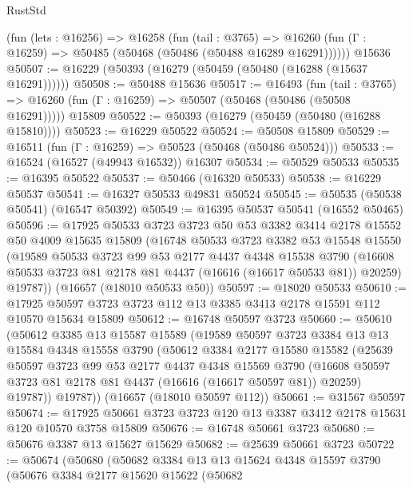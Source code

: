 \begin{lexlean}{RustStd}
\begin{coremodule}
    (fun (lets : @16256) =>
    @16258
      (fun (tail : @3765) =>
      @16260 (fun (Γ : @16259) => @50485 (@50468 (@50486 (@50488 @16289 @16291))))))
    @15636
@50507 := @16229 (@50393 (@16279 (@50459 (@50480 (@16288 (@15637 @16291))))))
@50508 := @50488 @15636
@50517 := @16493
    (fun (tail : @3765) => @16260 (fun (Γ : @16259) => @50507 (@50468 (@50486 (@50508 @16291)))))
    @15809
@50522 := @50393 (@16279 (@50459 (@50480 (@16288 @15810))))
@50523 := @16229 @50522
@50524 := @50508 @15809
@50529 := @16511 (fun (Γ : @16259) => @50523 (@50468 (@50486 @50524)))
@50533 := @16524 (@16527 (@49943 @16532)) @16307
@50534 := @50529 @50533
@50535 := @16395 @50522
@50537 := @50466 (@16320 @50533)
@50538 := @16229 @50537
@50541 := @16327 @50533 @49831 @50524
@50545 := @50535 (@50538 @50541) (@16547 @50392)
@50549 := @16395 @50537 @50541 (@16552 @50465)
@50596 := @17925
    @50533
    @3723
    @3723
    @50
    @53
    @3382
    @3414
    @2178
    @15552
    @50
    @4009
    @15635
    @15809
    (@16748
      @50533
      @3723
      @3382
      @53
      @15548
      @15550
      (@19589
        @50533
        @3723
        @99
        @53
        @2177
        @4437
        @4348
        @15538
        @3790
        (@16608 @50533 @3723 @81 @2178 @81 @4437 (@16616 (@16617 @50533 @81)) @20259)
        @19787))
    (@16657 (@18010 @50533 @50))
@50597 := @18020 @50533
@50610 := @17925 @50597 @3723 @3723 @112 @13 @3385 @3413 @2178 @15591 @112 @10570 @15634 @15809
@50612 := @16748 @50597 @3723
@50660 := @50610
    (@50612
      @3385
      @13
      @15587
      @15589
      (@19589
        @50597
        @3723
        @3384
        @13
        @13
        @15584
        @4348
        @15558
        @3790
        (@50612
          @3384
          @2177
          @15580
          @15582
          (@25639
            @50597
            @3723
            @99
            @53
            @2177
            @4437
            @4348
            @15569
            @3790
            (@16608 @50597 @3723 @81 @2178 @81 @4437 (@16616 (@16617 @50597 @81)) @20259)
            @19787))
        @19787))
    (@16657 (@18010 @50597 @112))
@50661 := @31567 @50597
@50674 := @17925 @50661 @3723 @3723 @120 @13 @3387 @3412 @2178 @15631 @120 @10570 @3758 @15809
@50676 := @16748 @50661 @3723
@50680 := @50676 @3387 @13 @15627 @15629
@50682 := @25639 @50661 @3723
@50722 := @50674
    (@50680
      (@50682
        @3384
        @13
        @13
        @15624
        @4348
        @15597
        @3790
        (@50676
          @3384
          @2177
          @15620
          @15622
          (@50682

\end{coremodule}
\end{lexlean}
